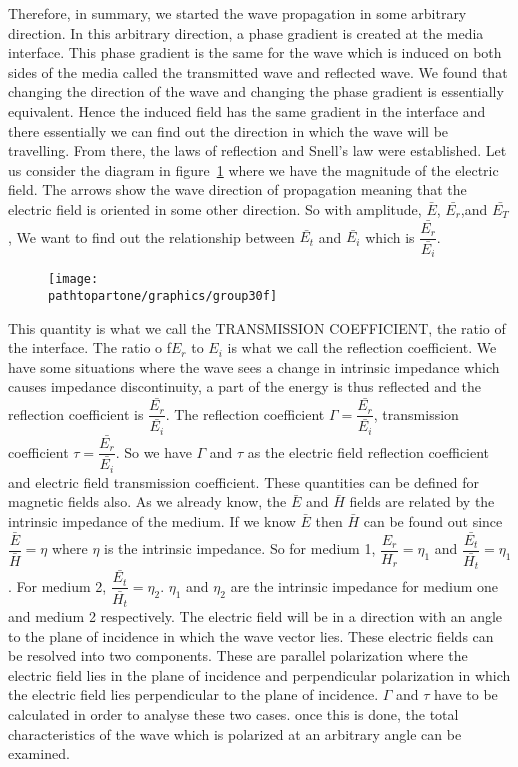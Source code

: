 Therefore, in summary, we started the wave propagation in some arbitrary direction. In this arbitrary direction, a phase gradient is created at the media interface. This phase gradient is the same for the wave which is induced on both sides of the media called the transmitted wave and reflected wave. We found that changing the direction of the wave and changing the phase gradient is essentially equivalent. Hence the induced field has the same gradient in the interface and there essentially we can find out the direction in which the wave will be travelling. From there, the laws of reflection and Snell's law were established. Let us consider the diagram in figure~\ref{fig:group30f} where we have the magnitude of the electric field. The arrows show the wave direction of propagation meaning that the electric field is oriented in some other direction. So with amplitude, $\bar{E}$, $\bar{E_r}$,and $\bar{E_T}$, We want to find out the relationship between $\bar{E_t}$ and $\bar{E_i}$ which is $\dfrac{\bar{E_r}}{\bar{E_i}}$.
\begin{figure}[h]
\centering
\texttt{[image: \\pathtopartone/graphics/group30f]}
\caption{}
\label{fig:group30f}
\end{figure}

This quantity is what we call the TRANSMISSION COEFFICIENT, the ratio of the interface. The ratio o f$ E_r$ to $E_i$ is what we call the reflection coefficient. We have some situations where the wave sees a change in intrinsic impedance which causes impedance discontinuity, a part of the energy is thus reflected and the reflection coefficient is $\dfrac{\bar{E_r}}{\bar{E_i}}$. The reflection coefficient $\Gamma=\dfrac{\bar{E_r}}{\bar{E_i}}$, transmission coefficient $\tau=\dfrac{\bar{E_r}}{\bar{E_i}}$. So we have $\Gamma$ and $\tau$ as the electric field reflection coefficient and electric field transmission coefficient. These quantities can be defined for magnetic fields also. As we already know, the $\bar{E}$ and $\bar{ H}$ fields are related by the intrinsic impedance of the medium. If we know $\bar{E}$ then $\bar{H}$ can be found out since $\dfrac{\bar{E}}{\bar{H}}=\eta$ where $\eta$ is the intrinsic impedance. So for medium 1,  $\dfrac{E_r}{H_r}=\eta_1$  and $\dfrac{\bar{E_t}}{\bar{H_t}}=\eta_1$. For medium 2, $\dfrac{\bar{E_t}}{\bar{H_t}}=\eta_2$. $\eta_1$ and $\eta_2$ are the intrinsic impedance for medium one and medium 2 respectively. The electric field will be in a direction with an angle to the plane of incidence in which the wave vector lies. These electric fields can be resolved into two components. These are parallel polarization where the electric field lies in the plane of incidence and perpendicular polarization in which the electric field lies perpendicular to the plane of incidence. $\Gamma$ and $\tau$ have to be calculated in order to analyse these two cases. once this is done, the total characteristics of the wave which is polarized at an arbitrary angle can be examined.
